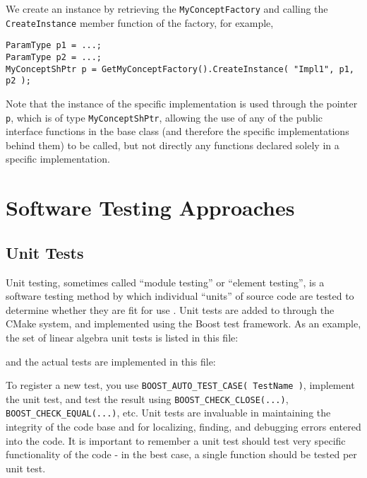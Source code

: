 We create an instance by retrieving the \lstinline{MyConceptFactory} and calling the \lstinline{CreateInstance} member function of the factory, for example,
\begin{lstlisting}
ParamType p1 = ...;
ParamType p2 = ...;
MyConceptShPtr p = GetMyConceptFactory().CreateInstance( "Impl1", p1, p2 );
\end{lstlisting}

Note that the instance of the specific implementation is used through the pointer \lstinline{p}, which is of type \lstinline{MyConceptShPtr}, allowing the use of any of the public interface functions in the base class (and therefore the specific implementations behind them) to be
called, but not directly any functions declared solely in a specific
implementation.



\section{Software Testing Approaches}

\subsection{Unit Tests}

Unit testing, sometimes called ``module testing'' or ``element testing'', is a
software testing method by which individual ``units'' of source code
are tested to determine whether they are fit for use
\cite{KFN-testing}.  Unit tests are added to {\nek} through the
CMake system, and implemented using the Boost test framework.
As an example, the set of linear algebra unit tests is
listed in this file:


and the actual tests are implemented in this file:


To register a new test, you use \lstinline{BOOST_AUTO_TEST_CASE( TestName )},
implement the unit test, and test the result using
\lstinline{BOOST_CHECK_CLOSE(...)}, \lstinline{BOOST_CHECK_EQUAL(...)}, etc. Unit
tests are invaluable in maintaining the integrity of the code base and
for localizing, finding, and debugging errors entered into the code. It is
important to remember a unit test should test very specific
functionality of the code - in the best case, a single function should be
tested per unit test.

